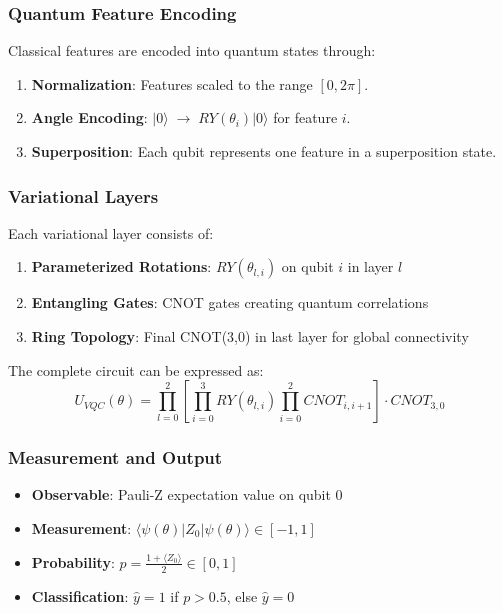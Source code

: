 \documentclass[conference]{IEEEtran}
\begin{document}
\subsubsection{Quantum Feature Encoding}
Classical features are encoded into quantum states through:
\begin{enumerate}
    \item \textbf{Normalization}: Features scaled to the range $[0, 2\pi]$.
    \item \textbf{Angle Encoding}: $\lvert 0\rangle \;\rightarrow\; RY(\theta_i)\lvert 0\rangle$ for feature $i$.
    \item \textbf{Superposition}: Each qubit represents one feature in a superposition state.
\end{enumerate}

\subsubsection{Variational Layers}
Each variational layer consists of:
\begin{enumerate}
    \item \textbf{Parameterized Rotations}: $RY(\theta_{l,i})$ on qubit $i$ in layer $l$
    \item \textbf{Entangling Gates}: CNOT gates creating quantum correlations
    \item \textbf{Ring Topology}: Final CNOT(3,0) in last layer for global connectivity
\end{enumerate}

The complete circuit can be expressed as:
$$U_{VQC}(\theta) = \prod_{l=0}^{2} \left[ \prod_{i=0}^{3} RY(\theta_{l,i}) \prod_{i=0}^{2} CNOT_{i,i+1} \right] \cdot CNOT_{3,0}$$

\subsubsection{Measurement and Output}
\begin{itemize}
    \item \textbf{Observable}: Pauli-Z expectation value on qubit 0
    \item \textbf{Measurement}: $\langle \psi(\theta) | Z_0 | \psi(\theta) \rangle \in [-1,1]$
    \item \textbf{Probability}: $p = \frac{1 + \langle Z_0 \rangle}{2} \in [0,1]$
    \item \textbf{Classification}: $\hat{y} = 1$ if $p > 0.5$, else $\hat{y} = 0$
\end{itemize}
\end{document}
